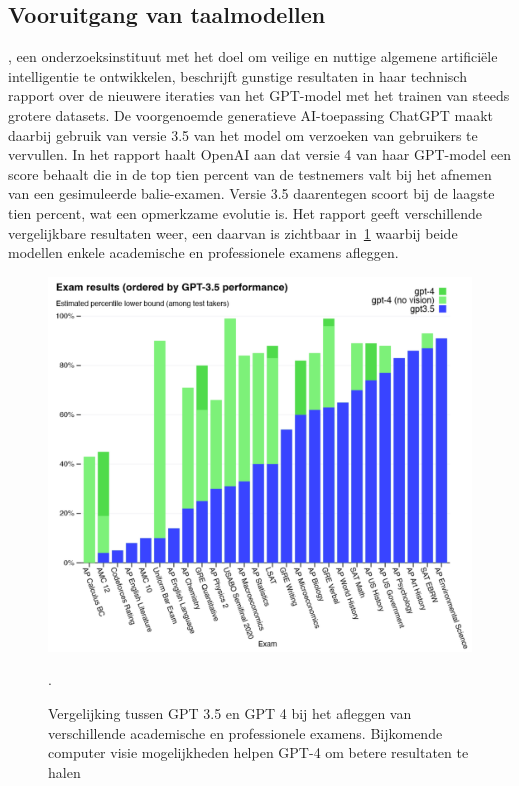 \subsection{Vooruitgang van taalmodellen}
\label{subsec:vooruitgang-van-taalmodellen}
\textcite{OpenAI2023}, een onderzoeksinstituut met het doel om veilige en nuttige algemene artifici\"ele intelligentie te ontwikkelen, beschrijft gunstige resultaten in haar technisch rapport over de nieuwere iteraties van het GPT-model met het trainen van steeds grotere datasets.
De voorgenoemde generatieve AI-toepassing ChatGPT maakt daarbij gebruik van versie 3.5 van het model om verzoeken van gebruikers te vervullen.
In het rapport haalt OpenAI aan dat versie 4 van haar GPT-model een score behaalt die in de top tien percent van de testnemers valt bij het afnemen van een gesimuleerde balie-examen.
Versie 3.5 daarentegen scoort bij de laagste tien percent, wat een opmerkzame evolutie is.
Het rapport geeft verschillende vergelijkbare resultaten weer, een daarvan is zichtbaar in~\ref{fig:gpt3.5-versus-4} waarbij beide modellen enkele academische en professionele examens afleggen.
\begin{figure}
    \includegraphics[width=1\linewidth]{images/gpt35-vs-4-exam-results}
    \caption{Vergelijking tussen GPT 3.5 en GPT 4 bij het afleggen van verschillende academische en professionele examens. Bijkomende computer visie mogelijkheden helpen GPT-4 om betere resultaten te halen~\autocite{OpenAI2023}}.
    \label{fig:gpt3.5-versus-4}
\end{figure}

